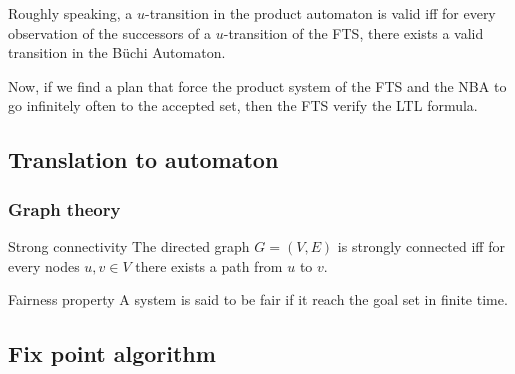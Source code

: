 Roughly speaking, a $u$-transition in the product automaton is valid iff for every observation of the successors of a $u$-transition of the FTS, there exists a valid transition in the B\"uchi Automaton.


Now, if we find a plan that force the product system of the FTS and the NBA to go infinitely often to the accepted set, then the FTS verify the LTL formula.


\subsection{Translation to \buchi{} automaton}



\subsubsection{Graph theory}

\begin{nameddef}{Strong connectivity}
The directed graph $G = (V,E)$ is strongly connected iff for every nodes $u,v \in V$ there exists a path from $u$ to $v$.
\end{nameddef}


\begin{nameddef}{Fairness property}
A system is said to be fair if it reach the goal set in finite time.
\end{nameddef}


\subsection{Fix point algorithm}

